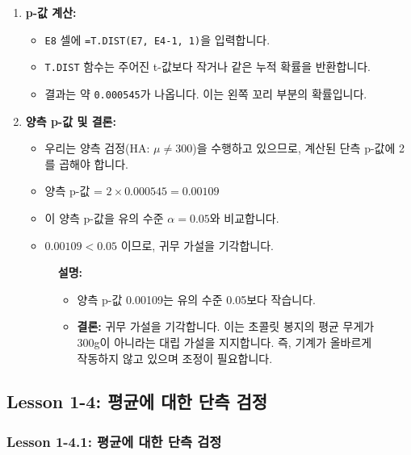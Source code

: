 \documentclass[11pt,a4paper]{article}
\theoremstyle{definition}
\begin{document}
\begin{enumerate}
    \item \textbf{p-값 계산:}
    \begin{itemize}
        \item \texttt{E8} 셀에 \texttt{=T.DIST(E7, E4-1, 1)}을 입력합니다.
        \item \texttt{T.DIST} 함수는 주어진 t-값보다 작거나 같은 누적 확률을 반환합니다.
        \item 결과는 약 \texttt{0.000545}가 나옵니다. 이는 왼쪽 꼬리 부분의 확률입니다.
    \end{itemize}

    \item \textbf{양측 p-값 및 결론:}
    \begin{itemize}
        \item 우리는 양측 검정(HA: $\mu \ne 300$)을 수행하고 있으므로, 계산된 단측 p-값에 2를 곱해야 합니다.
        \item 양측 p-값 = $2 \times 0.000545 = 0.00109$
        \item 이 양측 p-값을 유의 수준 $\alpha = 0.05$와 비교합니다.
        \item $0.00109 < 0.05$ 이므로, 귀무 가설을 기각합니다.
    \end{itemize}
    \begin{figure}[h!]
        \centering
        \label{fig:excel_p_value_conclusion}
        \vspace{0.5em}
        \textbf{설명:}
        \begin{itemize}
            \item 양측 p-값 0.00109는 유의 수준 0.05보다 작습니다.
            \item \textbf{결론:} 귀무 가설을 기각합니다. 이는 초콜릿 봉지의 평균 무게가 300g이 아니라는 대립 가설을 지지합니다. 즉, 기계가 올바르게 작동하지 않고 있으며 조정이 필요합니다.
        \end{itemize}
    \end{figure}
\end{enumerate}

\newpage
\subsection{Lesson 1-4: 평균에 대한 단측 검정}

\subsubsection{Lesson 1-4.1: 평균에 대한 단측 검정}
\end{document}
